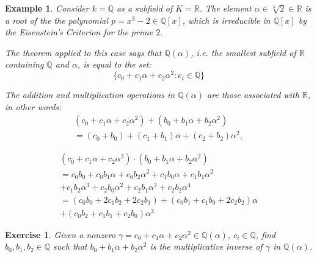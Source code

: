 \documentclass[a4paper,12pt]{report}
\newcounter{statement}
\numberwithin{statement}{chapter}
\newtheorem{eg}[statement]{\bf Example}
\newtheorem{ex}[statement]{\bf Exercise}
\numberwithin{equation}{chapter}
\numberwithin{section}{chapter}
\numberwithin{subsection}{section}
\begin{document}
\begin{eg}
Consider $k = \mathbb{Q}$ as a subfield of $K = \mathbb{R}$.
The element $\alpha \in \sqrt[3]{2} \in \mathbb{R}$
is a root of the the polynomial $p = x^3 - 2 \in \mathbb{Q}[x]$,
which is irreducible in $\mathbb{Q}[x]$ by the Eisenstein's Criterion for the prime $2$.


The theorem applied to this case says that $\mathbb{Q}(\alpha)$,
i.e. the smallest subfield of $\mathbb{R}$ containing $\mathbb{Q}$ and $\alpha$,
is equal to the set:
\[
\{c_0 + c_1 \alpha + c_2 \alpha^2 : c_i \in \mathbb{Q}\}
\]

The addition and multiplication operations in $\mathbb{Q}(\alpha)$
are those associated with $\mathbb{R}$, in other words:
\begin{multline*}
(c_0 + c_1 \alpha + c_2 \alpha^2) + (b_0 + b_1 \alpha + b_2 \alpha^2)\\
= (c_0 + b_0) + (c_1 + b_1)\alpha + (c_2 + b_2)\alpha^2,
\end{multline*}

\begin{multline*}
(c_0 + c_1 \alpha + c_2 \alpha^2) \cdot (b_0 + b_1 \alpha + b_2 \alpha^2)\\
= c_0b_0 + c_0b_1\alpha + c_0 b_2\alpha^2 + c_1 b_0\alpha + c_1b_1 \alpha^2\\ +
c_1b_2\alpha^3 + c_2b_0\alpha^2 + c_2b_1\alpha^3 + c_2b_2\alpha^4\\
= (c_0 b_0 + 2c_1b_2 + 2c_2b_1) + (c_0b_1 + c_1 b_0 + 2c_2b_2)\alpha \\
+ (c_0 b_2 + c_1 b_1 + c_2 b_0)\alpha^2
\end{multline*}

\end{eg}







\begin{ex}

Given  a nonzero $\gamma = c_0 + c_1\alpha + c_2 \alpha^2 \in \mathbb{Q}(\alpha)$,
$c_i \in \mathbb{Q}$, find $b_0, b_1, b_2 \in \mathbb{Q}$ such that
$b_0 + b_1 \alpha + b_2\alpha^2$ is the multiplicative inverse of $\gamma$ in $\mathbb{Q}(\alpha)$.

\end{ex}
\end{document}
